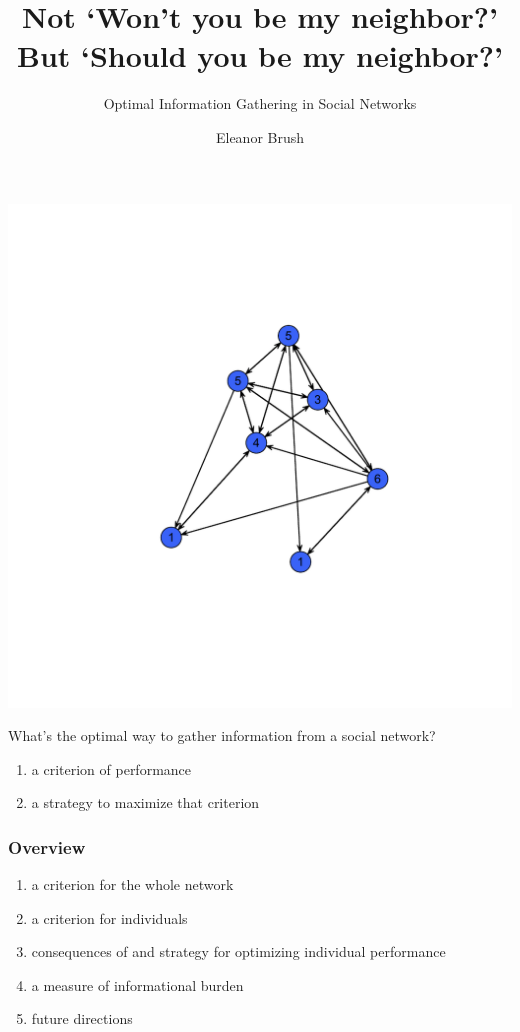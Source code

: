 \documentclass{beamer}
\title{Not `Won't you be my neighbor?' \\ But `Should you be my neighbor?'}
\subtitle{\textcolor{lightMyColor}{Optimal Information Gathering in Social Networks}}
\author{Eleanor Brush}
\begin{document}
\frame{\titlepage}

\begin{frame}

\begin{center}
\includegraphics[width=.8\textwidth]{social_network.pdf}
\end{center}

\end{frame}

\begin{frame}

\begin{center} {\Large What's the optimal way to gather information from a social network?}\end{center}

\begin{enumerate}
\pause \item a criterion of performance
\pause \item a strategy to maximize that criterion
\end{enumerate}
\end{frame}

\begin{frame}
\frametitle{Overview}
\begin{enumerate}
\item a criterion for the whole network
\item a criterion for individuals
\item consequences of and strategy for optimizing individual performance
\item a measure of informational burden
\item future directions
\end{enumerate}
\end{frame}
\end{document}
